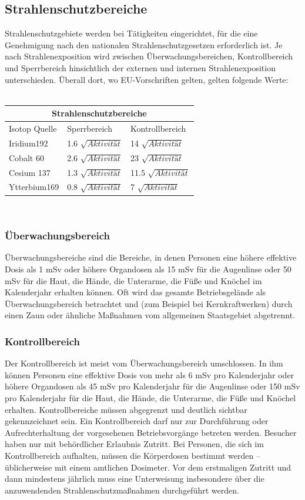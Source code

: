 \subsection{Strahlenschutzbereiche}
Strahlenschutzgebiete werden bei Tätigkeiten eingerichtet, für die eine Genehmigung nach den nationalen Strahlenschutzgesetzen erforderlich ist. Je nach Strahlenexposition wird zwischen Überwachungsbereichen, Kontrollbereich und Sperrbereich hinsichtlich der externen und internen Strahlenexposition unterschieden. Überall dort, wo EU-Vorschriften gelten, gelten folgende Werte:\\
\\
{
\begin{tabular}{ |p{2.5cm}|p{4cm}|p{4cm}|  }
\hline
\multicolumn{3}{|c|}{Strahlenschutzbereiche} \\
\hline
Isotop Quelle& Sperrbereich &Kontrollbereich \\
\hline
Iridium192 &1.6 $\sqrt{Aktivität}$&14 $\sqrt{Aktivität}$\\
\hline
Cobalt 60&2.6 $\sqrt{Aktivität}$&23 $\sqrt{Aktivität}$ \\
\hline
Cesium 137&1.3 $\sqrt{Aktivität}$& 11.5 $\sqrt{Aktivität}$\\
\hline
Ytterbium169&0.8 $\sqrt{Aktivität}$&7 $\sqrt{Aktivität}$ \\
\hline
\end{tabular} \\
\subsubsection{Überwachungsbereich}
Überwachungsbereiche sind die Bereiche, in denen Personen eine höhere effektive Dosis als 1 mSv oder höhere Organdosen als 15 mSv für die Augenlinse oder 50 mSv für die Haut, die Hände, die Unterarme, die Füße und Knöchel im Kalenderjahr erhalten können. Oft wird das gesamte Betriebsgelände als Überwachungsbereich betrachtet und (zum Beispiel bei Kernkraftwerken) durch einen Zaun oder ähnliche Maßnahmen vom allgemeinen Staatsgebiet abgetrennt.
\subsubsection{Kontrollbereich}
Der Kontrollbereich ist meist vom Überwachungsbereich umschlossen. In ihm können Personen eine effektive Dosis von mehr als 6 mSv pro Kalenderjahr oder höhere Organdosen als 45 mSv pro Kalenderjahr für die Augenlinse oder 150 mSv pro Kalenderjahr für die Haut, die Hände, die Unterarme, die Füße und Knöchel erhalten. Kontrollbereiche müssen abgegrenzt und deutlich sichtbar gekennzeichnet sein. Ein Kontrollbereich darf nur zur Durchführung oder Aufrechterhaltung der vorgesehenen Betriebsvorgänge betreten werden. Besucher haben nur mit behördlicher Erlaubnis Zutritt. Bei Personen, die sich im Kontrollbereich aufhalten, müssen die Körperdosen bestimmt werden – üblicherweise mit einem amtlichen Dosimeter. Vor dem erstmaligen Zutritt und dann mindestens jährlich muss eine Unterweisung insbesondere über die anzuwendenden Strahlenschutzmaßnahmen durchgeführt werden.

}
